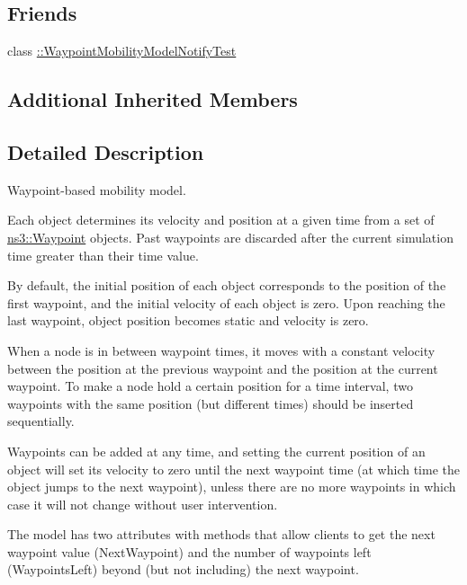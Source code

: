 \subsection*{Friends}
\begin{DoxyCompactItemize}
\item 
class \hyperlink{classns3_1_1WaypointMobilityModel_ab45056c1fe06773a99e50f7739408a8f}{\+::\+Waypoint\+Mobility\+Model\+Notify\+Test}
\end{DoxyCompactItemize}
\subsection*{Additional Inherited Members}


\subsection{Detailed Description}
Waypoint-\/based mobility model. 

Each object determines its velocity and position at a given time from a set of \hyperlink{classns3_1_1Waypoint}{ns3\+::\+Waypoint} objects. Past waypoints are discarded after the current simulation time greater than their time value.

By default, the initial position of each object corresponds to the position of the first waypoint, and the initial velocity of each object is zero. Upon reaching the last waypoint, object position becomes static and velocity is zero.

When a node is in between waypoint times, it moves with a constant velocity between the position at the previous waypoint and the position at the current waypoint. To make a node hold a certain position for a time interval, two waypoints with the same position (but different times) should be inserted sequentially.

Waypoints can be added at any time, and setting the current position of an object will set its velocity to zero until the next waypoint time (at which time the object jumps to the next waypoint), unless there are no more waypoints in which case it will not change without user intervention.

The model has two attributes with methods that allow clients to get the next waypoint value (Next\+Waypoint) and the number of waypoints left (Waypoints\+Left) beyond (but not including) the next waypoint.

